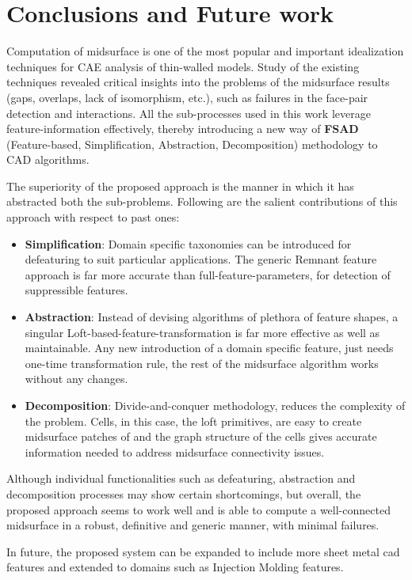 \section{Conclusions and Future work}

Computation of midsurface is one of the most popular and important idealization techniques for CAE analysis of  thin-walled models. Study of the existing techniques revealed critical insights into the problems of the  midsurface results (gaps, overlaps, lack of isomorphism, etc.), such as failures in the face-pair detection and interactions.  All the sub-processes used in this work leverage feature-information effectively, thereby introducing a new way of \textbf{FSAD} (Feature-based, Simplification, Abstraction, Decomposition)  methodology to CAD algorithms.

The superiority of the proposed approach is the manner in which it has abstracted both the sub-problems. Following are the salient contributions of this approach with respect to past ones:
\begin{itemize}[noitemsep,topsep=2pt,parsep=2pt,partopsep=2pt]
\item \textbf{Simplification}: Domain specific taxonomies can be introduced for defeaturing to suit particular applications. The generic Remnant feature approach is far more accurate than full-feature-parameters, for detection of suppressible features.
\item \textbf{Abstraction}: Instead of devising algorithms of plethora of feature shapes, a singular Loft-based-feature-transformation is far more effective as well as maintainable. Any new introduction of a domain specific feature, just needs one-time transformation rule, the rest of the midsurface algorithm works without any changes.
\item \textbf{Decomposition}: Divide-and-conquer methodology, reduces the complexity of the problem. Cells, in this case, the loft primitives, are easy to create midsurface patches of and the graph structure of the cells gives accurate information needed to address midsurface connectivity issues.
\end{itemize}

Although individual functionalities such as defeaturing, abstraction and decomposition processes may show certain shortcomings, but overall, the proposed approach seems to work well and is able to compute a well-connected midsurface in a robust, definitive and generic manner, with minimal failures.  

In future, the proposed system can be expanded to include more sheet metal cad features and extended to domains such as Injection Molding features.





